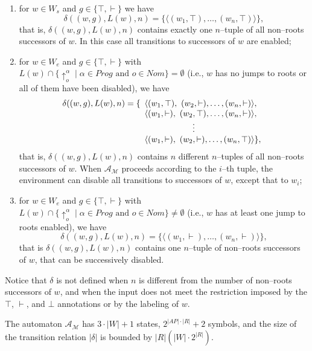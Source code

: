 \documentclass{LMCS}
\theoremstyle{plain}
\def \A             {\mathcal{A}}
\def \M             {\mathcal{M}}
\newcommand \tpl[1] {\langle #1 \rangle}
\begin{document}
\begin{enumerate}[$\bullet$]
\begin{enumerate}[$-$]
\begin{enumerate}[$*$]
\item
for $w\in W_s$ and $g\in \{\top,\vdash\}$ we have
    $$\delta((w,g),L(w),n) = \{ \tpl{(w_1,\top), \ldots, (w_n,\top)} \},$$
that is, $\delta((w,g),L(w),n)$ contains exactly one $n$--tuple of
all non--roots successors of $w$. In this case all transitions to
successors of $w$ are enabled;

\item
for $w\in W_e$ and $g\in \{\top,\vdash\}$ with $L(w) \cap
\{\uparrow_o^{\alpha} \mid \alpha \in Prog \text{ and } o \in Nom
\} = \emptyset$ (i.e., $w$ has no jumps to roots or all of them
have been disabled), we have
\begin{displaymath}
    \delta((w,g),L(w),n) = \{\begin{array}[t]{l}
        \tpl{(w_1,\top),\ (w_2,\vdash),\ldots,(w_n,\vdash)},\\
        \tpl{(w_1,\vdash),\ (w_2,\top),\ldots,(w_n,\vdash)},\\
        \hspace{2cm} \vdots \\
        \tpl{(w_1,\vdash),\ (w_2,\vdash),\ldots,(w_n,\top)}\},
    \end{array}
\end{displaymath}
that is, $\delta((w,g),L(w),n)$ contains $n$ different $n$--tuples
of all non--roots successors of $w$. When $\A_{\M}$ proceeds
according to the $i$--th tuple, the environment can disable all
transitions to successors of $w$, except that to $w_i$;

\item
for $w\in W_e$ and $g\in \{\top,\vdash\}$ with $L(w) \cap
\{\uparrow_o^{\alpha} \mid \alpha \in Prog \text{ and } o \in Nom
\} \neq \emptyset$ (i.e., $w$ has at least one jump to roots
enabled), we have
    $$\delta((w,g),L(w),n) = \{ \tpl{(w_1,\vdash), \ldots, (w_n,\vdash)} \},$$
that is $\delta((w,g),L(w),n)$ contains one $n$--tuple of
non--roots successors of $w$, that can be successively disabled.
\end{enumerate}
\end{enumerate}
\end{enumerate}

Notice that $\delta$ is not defined when $n$ is different from the
number of non--roots successors of $w$, and when the input does
not meet the restriction imposed by the $\top$, $\vdash$, and
$\bot$ annotations or by the labeling of $w$.

The automaton $\A_{\M}$ has $3 \cdot |W| + 1$ states, $2^{|AP|
\cdot |R|}+2$ symbols, and the size of the transition relation
$|\delta|$ is bounded by $|R|(|W| \cdot 2^{|R|})$.
\end{document}
